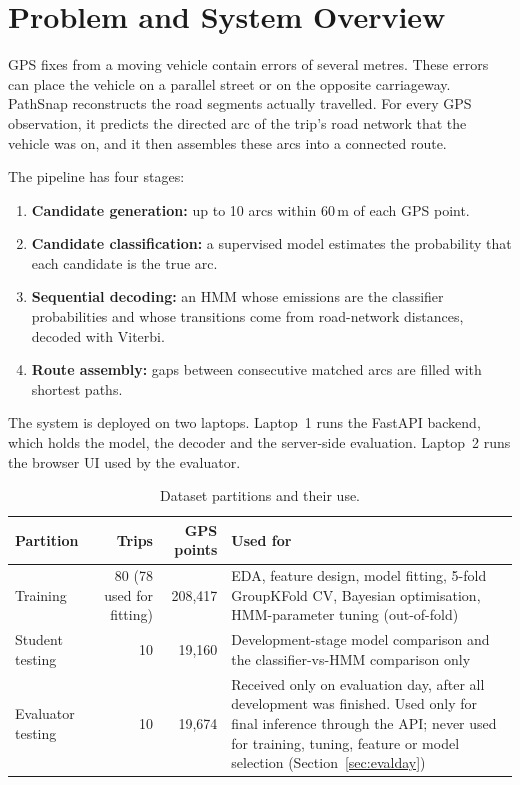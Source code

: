 \documentclass[10pt,a4paper]{article}
\begin{document}
\section{Problem and System Overview}
GPS fixes from a moving vehicle contain errors of several metres. These errors can place the vehicle on a parallel street or on the opposite carriageway. PathSnap reconstructs the road segments actually travelled. For every GPS observation, it predicts the directed arc of the trip's road network that the vehicle was on, and it then assembles these arcs into a connected route.

The pipeline has four stages:
\begin{enumerate}
  \item \textbf{Candidate generation:} up to 10 arcs within 60\,m of each GPS point.
  \item \textbf{Candidate classification:} a supervised model estimates the probability that each candidate is the true arc.
  \item \textbf{Sequential decoding:} an HMM whose emissions are the classifier probabilities and whose transitions come from road-network distances, decoded with Viterbi.
  \item \textbf{Route assembly:} gaps between consecutive matched arcs are filled with shortest paths.
\end{enumerate}
The system is deployed on two laptops. Laptop~1 runs the FastAPI backend, which holds the model, the decoder and the server-side evaluation. Laptop~2 runs the browser UI used by the evaluator.

\begin{table}[H]\centering\small
\caption{Dataset partitions and their use.}
\begin{tabularx}{\textwidth}{lrrL}
\toprule
Partition & Trips & GPS points & Used for\\
\midrule
Training & 80 (78 used for fitting) & 208{,}417 & EDA, feature design, model fitting, 5-fold GroupKFold CV, Bayesian optimisation, HMM-parameter tuning (out-of-fold)\\
Student testing & 10 & 19{,}160 & Development-stage model comparison and the classifier-vs-HMM comparison only\\
Evaluator testing & 10 & 19{,}674 & Received only on evaluation day, after all development was finished. Used only for final inference through the API; never used for training, tuning, feature or model selection (Section~\ref{sec:evalday})\\
\bottomrule
\end{tabularx}
\end{table}
\end{document}
